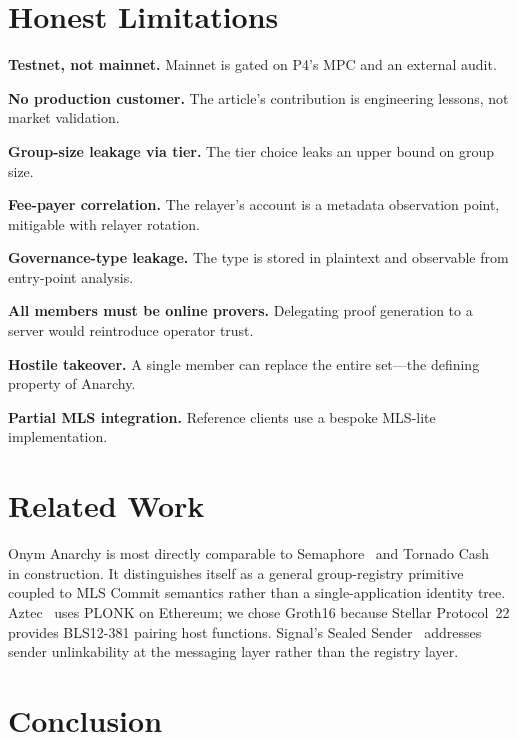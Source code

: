 \documentclass[journal]{IEEEtran}
\begin{document}
\section{Honest Limitations}

\textbf{Testnet, not mainnet.} Mainnet is gated on P4's MPC and an external audit.

\textbf{No production customer.} The article's contribution is engineering lessons, not market validation.

\textbf{Group-size leakage via tier.} The tier choice leaks an upper bound on group size.

\textbf{Fee-payer correlation.} The relayer's account is a metadata observation point, mitigable with relayer rotation.

\textbf{Governance-type leakage.} The type is stored in plaintext and observable from entry-point analysis.

\textbf{All members must be online provers.} Delegating proof generation to a server would reintroduce operator trust.

\textbf{Hostile takeover.} A single member can replace the entire set---the defining property of Anarchy.

\textbf{Partial MLS integration.} Reference clients use a bespoke MLS-lite implementation.

\section{Related Work}

Onym Anarchy is most directly comparable to Semaphore~\cite{semaphore2024} and Tornado Cash~\cite{wang2022tornado} in construction. It distinguishes itself as a general group-registry primitive coupled to MLS Commit semantics rather than a single-application identity tree. Aztec~\cite{williamson2022aztec} uses PLONK on Ethereum; we chose Groth16 because Stellar Protocol~22 provides BLS12-381 pairing host functions. Signal's Sealed Sender~\cite{lund2018sealed} addresses sender unlinkability at the messaging layer rather than the registry layer.

\section{Conclusion}
\end{document}
